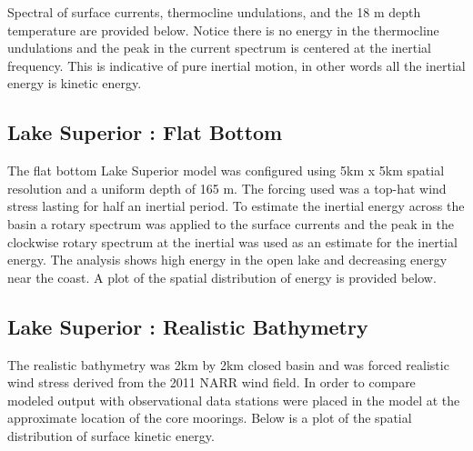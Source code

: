 Spectral of surface currents, thermocline undulations, and the 18 m depth temperature are provided below. Notice there is no energy in the thermocline undulations
and the peak in the current spectrum is centered at the inertial frequency. This is indicative of pure inertial motion, in other words all the inertial energy is kinetic energy. 



\subsection{Lake Superior : Flat Bottom}

The flat bottom Lake Superior model was configured using 5km x 5km spatial resolution and a uniform depth of 165 m. 
The forcing used was a top-hat wind stress lasting for half an inertial period. 
To estimate the inertial energy across the basin a rotary spectrum was applied to the surface currents and the peak in the
clockwise rotary spectrum at the inertial was used as an estimate for the inertial energy. The analysis shows
high energy in the open lake and decreasing energy near the coast. A plot of the spatial distribution of energy is provided below.




\subsection{Lake Superior : Realistic Bathymetry}

The realistic bathymetry was 2km by 2km closed basin and was forced realistic wind stress derived from 
the 2011 NARR wind field. In order to compare modeled output with observational data stations were
placed in the model at the approximate location of the core moorings. Below is a plot of the spatial distribution of surface kinetic energy.

